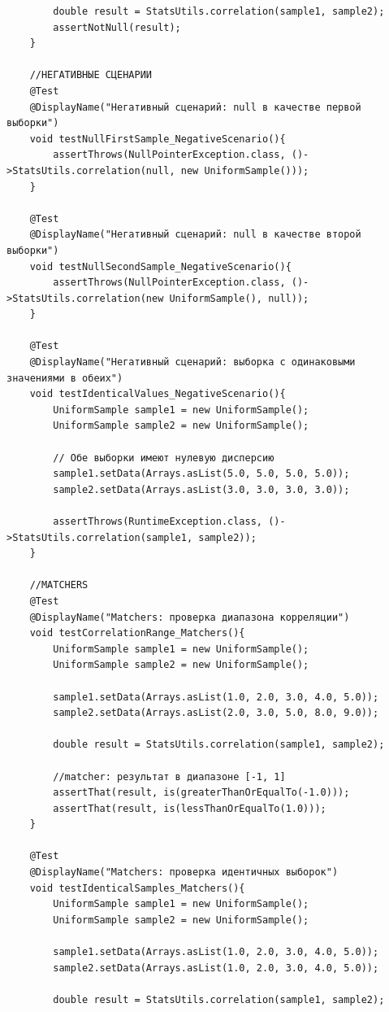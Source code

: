 \begin{verbatim}
        double result = StatsUtils.correlation(sample1, sample2);
        assertNotNull(result);
    }

    //НЕГАТИВНЫЕ СЦЕНАРИИ
    @Test
    @DisplayName("Негативный сценарий: null в качестве первой выборки")
    void testNullFirstSample_NegativeScenario(){
        assertThrows(NullPointerException.class, ()->StatsUtils.correlation(null, new UniformSample()));
    }

    @Test
    @DisplayName("Негативный сценарий: null в качестве второй выборки")
    void testNullSecondSample_NegativeScenario(){
        assertThrows(NullPointerException.class, ()->StatsUtils.correlation(new UniformSample(), null));
    }

    @Test
    @DisplayName("Негативный сценарий: выборка с одинаковыми значениями в обеих")
    void testIdenticalValues_NegativeScenario(){
        UniformSample sample1 = new UniformSample();
        UniformSample sample2 = new UniformSample();

        // Обе выборки имеют нулевую дисперсию
        sample1.setData(Arrays.asList(5.0, 5.0, 5.0, 5.0));
        sample2.setData(Arrays.asList(3.0, 3.0, 3.0, 3.0));

        assertThrows(RuntimeException.class, ()->StatsUtils.correlation(sample1, sample2));
    }

    //MATCHERS
    @Test
    @DisplayName("Matchers: проверка диапазона корреляции")
    void testCorrelationRange_Matchers(){
        UniformSample sample1 = new UniformSample();
        UniformSample sample2 = new UniformSample();

        sample1.setData(Arrays.asList(1.0, 2.0, 3.0, 4.0, 5.0));
        sample2.setData(Arrays.asList(2.0, 3.0, 5.0, 8.0, 9.0));

        double result = StatsUtils.correlation(sample1, sample2);

        //matcher: результат в диапазоне [-1, 1]
        assertThat(result, is(greaterThanOrEqualTo(-1.0)));
        assertThat(result, is(lessThanOrEqualTo(1.0)));
    }

    @Test
    @DisplayName("Matchers: проверка идентичных выборок")
    void testIdenticalSamples_Matchers(){
        UniformSample sample1 = new UniformSample();
        UniformSample sample2 = new UniformSample();

        sample1.setData(Arrays.asList(1.0, 2.0, 3.0, 4.0, 5.0));
        sample2.setData(Arrays.asList(1.0, 2.0, 3.0, 4.0, 5.0));

        double result = StatsUtils.correlation(sample1, sample2);


\end{verbatim}
